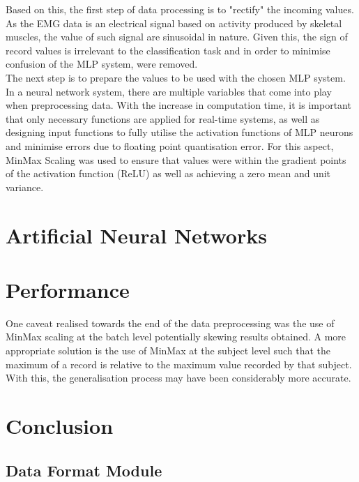 \documentclass[11pt]{article}
\begin{document}
	\noindent
	Based on this, the first step of data processing is to "rectify" the incoming values. As the EMG data is an electrical signal based on activity produced by skeletal muscles, the value of such signal are sinusoidal in nature. Given this, the sign of record values is irrelevant to the classification task and in order to minimise confusion of the MLP system, were removed.\\
	
	\noindent
	The next step is to prepare the values to be used with the chosen MLP system. In a neural network system, there are multiple variables that come into play when preprocessing data. With the increase in computation time, it is important that only necessary functions are applied for real-time systems, as well as designing input functions to fully utilise the activation functions of MLP neurons and minimise errors due to floating point quantisation error. For this aspect, MinMax Scaling was used to ensure that values were within the gradient points of the activation function (ReLU) as well as achieving a zero mean and unit variance.
	
	\section{Artificial Neural Networks}
	
	
	\section{Performance}
	
	One caveat realised towards the end of the data preprocessing was the use of MinMax scaling at the batch level potentially skewing results obtained. A more appropriate solution is the use of MinMax at the subject level such that the maximum of a record is relative to the maximum value recorded by that subject. With this, the generalisation process may have been considerably more accurate. 
		
	
	\section{Conclusion}
	
	\newpage
	\nocite{*}	
	
	{}
	
	\newpage
	\begin{appendices}
		\section{Data Format Module}\label{adx:data_format}
		
	\end{appendices}	
\end{document}
